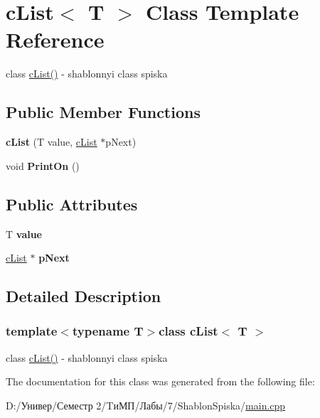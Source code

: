 \hypertarget{classc_list}{}\section{c\+List$<$ T $>$ Class Template Reference}
\label{classc_list}


class \hyperlink{classc_list}{c\+List()} -\/ shablonnyi class spiska  


\subsection*{Public Member Functions}
\begin{DoxyCompactItemize}
\item 
\hypertarget{classc_list_a831d4f2b313315c6ea55153ee4261080}{}{\bfseries c\+List} (T value, \hyperlink{classc_list}{c\+List} $\ast$p\+Next)\label{classc_list_a831d4f2b313315c6ea55153ee4261080}

\item 
\hypertarget{classc_list_a2487cd17d2efea568ce50d70e2a17c50}{}void {\bfseries Print\+On} ()\label{classc_list_a2487cd17d2efea568ce50d70e2a17c50}

\end{DoxyCompactItemize}
\subsection*{Public Attributes}
\begin{DoxyCompactItemize}
\item 
\hypertarget{classc_list_a9b2c5c3a51bc77e576858f882b79de0d}{}T {\bfseries value}\label{classc_list_a9b2c5c3a51bc77e576858f882b79de0d}

\item 
\hypertarget{classc_list_a11848b9dcaf3aa9d7a0bbb3e06c83724}{}\hyperlink{classc_list}{c\+List} $\ast$ {\bfseries p\+Next}\label{classc_list_a11848b9dcaf3aa9d7a0bbb3e06c83724}

\end{DoxyCompactItemize}


\subsection{Detailed Description}
\subsubsection*{template$<$typename T$>$class c\+List$<$ T $>$}

class \hyperlink{classc_list}{c\+List()} -\/ shablonnyi class spiska 

The documentation for this class was generated from the following file\+:\begin{DoxyCompactItemize}
\item 
D\+:/Универ/Семестр 2/\+TиМП/Лабы/7/\+Shablon\+Spiska/\hyperlink{main_8cpp}{main.\+cpp}\end{DoxyCompactItemize}
